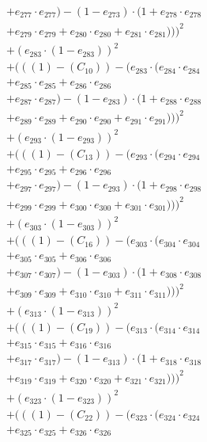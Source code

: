 \documentclass[10pt, a4paper]{article}
\begin{document}
\begin{align*}
& + e_{277} \cdot e_{277}) - (1 - e_{273}) \cdot (1 + e_{278} \cdot e_{278} \\
& + e_{279} \cdot e_{279} + e_{280} \cdot e_{280} + e_{281} \cdot e_{281})))^{2} \\
& + (e_{283} \cdot (1 - e_{283}))^{2} \\
& + (((1) - (C_{10})) - (e_{283} \cdot (e_{284} \cdot e_{284} \\
& + e_{285} \cdot e_{285} + e_{286} \cdot e_{286} \\
& + e_{287} \cdot e_{287}) - (1 - e_{283}) \cdot (1 + e_{288} \cdot e_{288} \\
& + e_{289} \cdot e_{289} + e_{290} \cdot e_{290} + e_{291} \cdot e_{291})))^{2} \\
& + (e_{293} \cdot (1 - e_{293}))^{2} \\
& + (((1) - (C_{13})) - (e_{293} \cdot (e_{294} \cdot e_{294} \\
& + e_{295} \cdot e_{295} + e_{296} \cdot e_{296} \\
& + e_{297} \cdot e_{297}) - (1 - e_{293}) \cdot (1 + e_{298} \cdot e_{298} \\
& + e_{299} \cdot e_{299} + e_{300} \cdot e_{300} + e_{301} \cdot e_{301})))^{2} \\
& + (e_{303} \cdot (1 - e_{303}))^{2} \\
& + (((1) - (C_{16})) - (e_{303} \cdot (e_{304} \cdot e_{304} \\
& + e_{305} \cdot e_{305} + e_{306} \cdot e_{306} \\
& + e_{307} \cdot e_{307}) - (1 - e_{303}) \cdot (1 + e_{308} \cdot e_{308} \\
& + e_{309} \cdot e_{309} + e_{310} \cdot e_{310} + e_{311} \cdot e_{311})))^{2} \\
& + (e_{313} \cdot (1 - e_{313}))^{2} \\
& + (((1) - (C_{19})) - (e_{313} \cdot (e_{314} \cdot e_{314} \\
& + e_{315} \cdot e_{315} + e_{316} \cdot e_{316} \\
& + e_{317} \cdot e_{317}) - (1 - e_{313}) \cdot (1 + e_{318} \cdot e_{318} \\
& + e_{319} \cdot e_{319} + e_{320} \cdot e_{320} + e_{321} \cdot e_{321})))^{2} \\
& + (e_{323} \cdot (1 - e_{323}))^{2} \\
& + (((1) - (C_{22})) - (e_{323} \cdot (e_{324} \cdot e_{324} \\
& + e_{325} \cdot e_{325} + e_{326} \cdot e_{326} \\

\end{align*}
\end{document}

